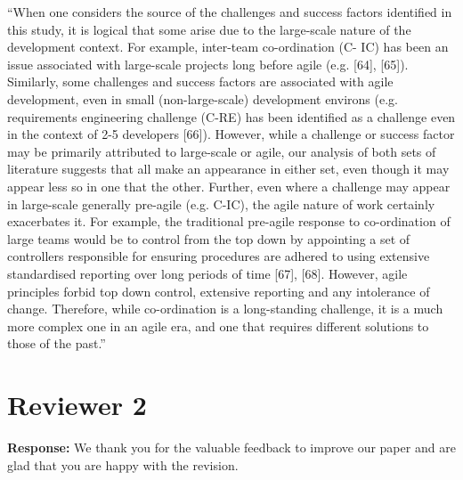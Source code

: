 \documentclass[a4paper,twoside,11pt]{reviewresponse}
\begin{document}
\begin{itemize}
``When one considers the source of the challenges and success factors identified in this study, it is logical that some arise due to the large-scale nature of the development context. For example, inter-team co-ordination (C- IC) has been an issue associated with large-scale projects long before agile (e.g. [64], [65]). Similarly, some challenges and success factors are associated with agile development, even in small (non-large-scale) development environs (e.g. requirements engineering challenge (C-RE) has been identified as a challenge even in the context of 2-5 developers [66]). However, while a challenge or success factor may be primarily attributed to large-scale or agile, our analysis of both sets of literature suggests that all make an appearance in either set, even though it may appear less so in one that the other. Further, even where a challenge may appear in large-scale generally pre-agile (e.g. C-IC), the agile nature of work certainly exacerbates it. For example, the traditional pre-agile response to co-ordination of large teams would be to control from the top down by appointing a set of controllers responsible for ensuring procedures are adhered to using extensive standardised reporting over long periods of time [67], [68]. However, agile principles forbid top down control, extensive reporting and any intolerance of change. Therefore, while co-ordination is a long-standing challenge, it is a much more complex one in an agile era, and one that requires different solutions to those of the past.''
\end{itemize}

\clearpage

\section{Reviewer 2}
\textbf{Response:}
We thank you for the valuable feedback to improve our paper and are glad that you are happy with the revision.
\end{document}
